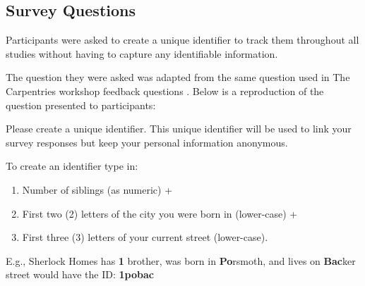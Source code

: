 \documentclass[030-workshop.tex]{subfiles}
\begin{document}
\subsection{Survey Questions}
\label{sse:assessment-study}

Participants were asked to create a unique identifier to track them throughout all studies without
having to capture any identifiable information.

The question they were asked was adapted from the same question used in The Carpentries
workshop feedback questions
\cite{jordanAnalysisCarpentriesLongTerm2017, jordanAnalysisCarpentriesLongTerm2018, jordanAnalysisCarpentriesLongTerm2020, jordanAnalysisSoftwareCarpentry2017, jordanAnalysisSoftwareData2018, jordanCarpentries2020Annual, jordanDataCarpentryAssessment2016}. %
Below is a reproduction of the question presented to participants:

\begin{displayquote}
    Please create a unique identifier.
    This unique identifier will be used to link your survey responses but keep your personal information anonymous.

    To create an identifier type in:
    \begin{enumerate}
        \item Number of siblings (as numeric) +
        \item First two (2) letters of the city you were born in (lower-case) +
        \item First three (3) letters of your current street (lower-case).
    \end{enumerate}

    E.g., Sherlock Homes has \textbf{1} brother,
    was born in \textbf{Po}rsmoth,
    and lives on \textbf{Bac}ker street would have the ID: \textbf{1pobac}
\end{displayquote}
\end{document}
